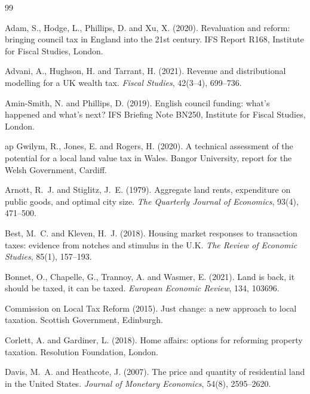 \begin{thebibliography}{99}

Adam, S., Hodge, L., Phillips, D. and Xu, X. (2020).
\newblock Revaluation and reform: bringing council tax in England into the 21st century.
\newblock IFS Report R168, Institute for Fiscal Studies, London.

Advani, A., Hughson, H. and Tarrant, H. (2021).
\newblock Revenue and distributional modelling for a UK wealth tax.
\newblock \emph{Fiscal Studies}, 42(3--4), 699--736.

Amin-Smith, N. and Phillips, D. (2019).
\newblock English council funding: what's happened and what's next?
\newblock IFS Briefing Note BN250, Institute for Fiscal Studies, London.

ap Gwilym, R., Jones, E. and Rogers, H. (2020).
\newblock A technical assessment of the potential for a local land value tax in Wales.
\newblock Bangor University, report for the Welsh Government, Cardiff.

Arnott, R.~J. and Stiglitz, J.~E. (1979).
\newblock Aggregate land rents, expenditure on public goods, and optimal city size.
\newblock \emph{The Quarterly Journal of Economics}, 93(4), 471--500.

Best, M.~C. and Kleven, H.~J. (2018).
\newblock Housing market responses to transaction taxes: evidence from notches and stimulus in the U.K.
\newblock \emph{The Review of Economic Studies}, 85(1), 157--193.

Bonnet, O., Chapelle, G., Trannoy, A. and Wasmer, E. (2021).
\newblock Land is back, it should be taxed, it can be taxed.
\newblock \emph{European Economic Review}, 134, 103696.

Commission on Local Tax Reform (2015).
\newblock Just change: a new approach to local taxation.
\newblock Scottish Government, Edinburgh.

Corlett, A. and Gardiner, L. (2018).
\newblock Home affairs: options for reforming property taxation.
\newblock Resolution Foundation, London.

Davis, M.~A. and Heathcote, J. (2007).
\newblock The price and quantity of residential land in the United States.
\newblock \emph{Journal of Monetary Economics}, 54(8), 2595--2620.


\end{thebibliography}
